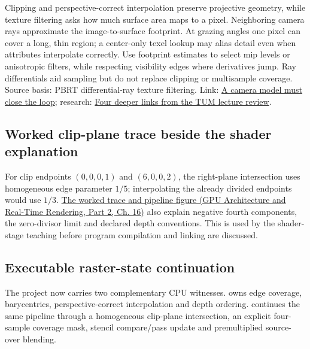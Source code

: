 Clipping and perspective-correct interpolation preserve projective geometry, while texture filtering asks how much surface area maps to a pixel. Neighboring camera rays approximate the image-to-surface footprint. At grazing angles one pixel can cover a long, thin region; a center-only texel lookup may alias detail even when attributes interpolate correctly. Use footprint estimates to select mip levels or anisotropic filters, while respecting visibility edges where derivatives jump. Ray differentials aid sampling but do not replace clipping or multisample coverage. Source basis: PBRT differential-ray texture filtering. Link: \hyperref[02-foundations-ii-ch037-a-camera-model-must-close-the-loop]{A camera model must close the loop}; research: \hyperref[02-foundations-ii-ch036-four-deeper-links-from-the-tum-lecture-review]{Four deeper links from the TUM lecture review}.

\subsection{Worked clip-plane trace beside the shader explanation}\label{appendix-40426e4b2103-worked-clip-plane-trace-beside-the-shader-explanation}

\hypertarget{appendix-40426e4b2103-worked-clip-plane-trace-beside-the-shader-explanation}{}

For clip endpoints \((0,0,0,1)\) and \((6,0,0,2)\), the right-plane intersection uses homogeneous edge parameter \(1/5\); interpolating the already divided endpoints would use \(1/3\). \href{../06-GPU-Architecture-and-Real-Time-Rendering-P02/main.pdf\#nameddest=06-engine-ii-ch025-clip-coordinates-are-not-normalized-device-coordinates}{The worked trace and pipeline figure (GPU Architecture and Real-Time Rendering, Part 2, Ch. 16)} also explain negative fourth components, the zero-divisor limit and declared depth conventions. This is used by the shader-stage teaching before program compilation and linking are discussed.

\subsection{Executable raster-state continuation}\label{appendix-40426e4b2103-executable-raster-state-continuation}

\hypertarget{appendix-40426e4b2103-executable-raster-state-continuation}{}

The project now carries two complementary CPU witnesses.  owns edge coverage, barycentrics, perspective-correct interpolation and depth ordering.  continues the same pipeline through a homogeneous clip-plane intersection, an explicit four-sample coverage mask, stencil compare/pass update and premultiplied source-over blending.

